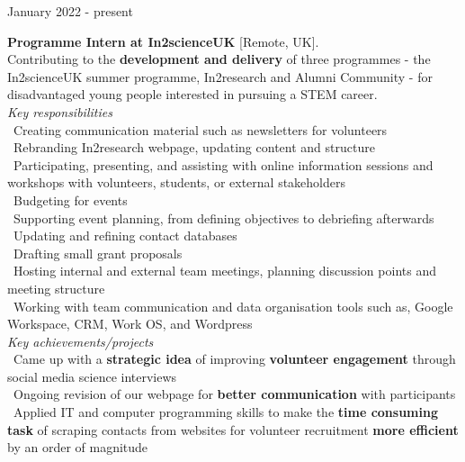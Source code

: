 \documentclass[11pt, a4paper]{article}
\begin{document}
\begin{flushright} January 2022 - present 
\end{flushright}	
\textbf{Programme Intern at In2scienceUK} [Remote, UK].
\\
Contributing to the \textbf{development and delivery} of three programmes - the In2scienceUK summer programme, 
In2research and Alumni Community - for disadvantaged 
young people interested in pursuing a STEM career.
\\
\textit{Key responsibilities}
\\
\textbullet \ Creating communication material such as newsletters for volunteers 
\\
\textbullet \ Rebranding In2research webpage, updating content and structure
\\
\textbullet \ Participating, presenting, and assisting with online information sessions and workshops with volunteers, students, or external stakeholders
\\
\textbullet \ Budgeting for events
\\
\textbullet \ Supporting event planning, from defining objectives to debriefing afterwards
\\
\textbullet \ Updating and refining contact databases 
\\
\textbullet \ Drafting small grant proposals
\\
\textbullet \ Hosting internal and external team meetings, planning discussion points and meeting structure
\\
\textbullet \ Working with team communication and data organisation tools such as, Google Workspace, CRM, Work OS, and Wordpress
\\
\textit{Key achievements/projects}
\\
\textbullet \ Came up with a \textbf{strategic idea} of improving \textbf{volunteer engagement} through social media science interviews
\\
\textbullet \ Ongoing revision of our webpage for \textbf{better communication} with participants 
\\ 
\textbullet \ Applied IT and computer programming skills to make the \textbf{time consuming task} of scraping 
contacts from websites for volunteer recruitment \textbf{more efficient} by an order of magnitude
\\[0.1cm]
\end{document}
